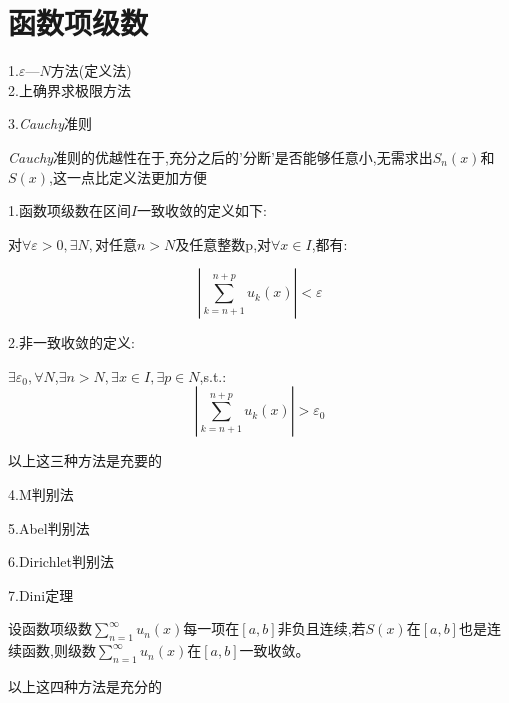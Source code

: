 \documentclass{ctexart}
\begin{document}
\section{函数项级数}
\begin{tcolorbox}[title = {七种收敛判定方法},colbacktitle=green!35!black,colback=green!1,arc = 3mm, outer arc = 3mm,fonttitle = \itshape, fontupper = \itshape, fontlower = \itshape]
   1.$\varepsilon—N$方法(定义法)\\
   2.上确界求极限方法
    
   3.\textit{Cauchy}准则
    \begin{tcolorbox}[colback=white,arc = 1mm, outer arc = 1mm,fonttitle = \itshape, fontupper = \itshape, fontlower = \itshape]
   {\color{blue}\textit{Cauchy}准则的优越性在于,充分之后的'分断'是否能够任意小,无需求出$S_{n}(x)$和$S(x)$,这一点比定义法更加方便}
   
   1.函数项级数在区间$I$一致收敛的定义如下:
   
   对$\forall \varepsilon >0,\exists N,$对任意$n>N$及任意整数p,对$\forall x \in I$,都有:
   
   $$\left|\sum_{k=n+1}^{n+p}u_{k}(x)\right| < \varepsilon$$
   
   2.非一致收敛的定义:
   
   $\exists \varepsilon_{0},\forall N$,$\exists n > N,\exists x \in I,\exists p \in N$,s.t.:
   $$\left|\sum_{k=n+1}^{n+p}u_{k}(x)\right| > \varepsilon_{0}$$
        
   
   
   \end{tcolorbox}
   
  {\color{red}以上这三种方法是充要的}
  
  4.M判别法
  
  5.Abel判别法
  
  6.Dirichlet判别法
  
  7.Dini定理
  	\begin{tcolorbox}[colback=white,arc = 1mm, outer arc = 1mm,fonttitle = \itshape, fontupper = \itshape, fontlower = \itshape]
  		设函数项级数$\displaystyle{\sum_{n=1}^{\infty}u_{n}(x)}$每一项在$\left[a,b \right]$非负且连续,若$S(x)$在$\left[a,b \right]$也是连续函数,则级数$\displaystyle{\sum_{n=1}^{\infty}u_{n}(x)}$在$\left[a,b \right]$一致收敛。
\end{tcolorbox}
  {\color{red}以上这四种方法是充分的}  
 \end{tcolorbox}
\begin{tcolorbox}[title = {一致收敛的性质},colbacktitle=green!35!black,colback=green!1,arc = 3mm, outer arc = 3mm,fonttitle = \itshape, fontupper = \itshape, fontlower = \itshape]
	
	
\end{tcolorbox}
\end{document}
